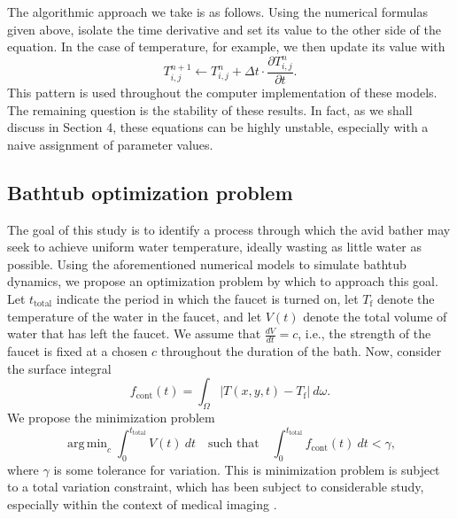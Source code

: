 \documentclass[12pt]{amsart}
\newcommand{\abs}[1]{\left|#1\right|}
\DeclareMathOperator*{\argmin}{\mathrm{arg\,min}}
\begin{document}
The algorithmic approach we take is as follows. Using the numerical formulas
given above, isolate the time derivative and set its value to the other side of
the equation. In the case of temperature, for example, we then update its value
with
\begin{equation}
    T_{i,j}^{n+1} \leftarrow T_{i,j}^{n} + \Delta t \cdot \frac{\partial
        T_{i,j}^n}{\partial t}.
    \label{eq:\theequation}
\end{equation}
This pattern is used throughout the computer implementation of these models. The
remaining question is the stability of these results. In fact, as we shall
discuss in Section 4, these equations can be highly unstable, especially with a
naive assignment of parameter values.



\subsection{Bathtub optimization problem}

The goal of this study is to identify a process through which the avid bather
may seek to achieve uniform water temperature, ideally wasting as little water
as possible. Using the aforementioned numerical models to simulate bathtub
dynamics, we propose an optimization problem by which to approach this goal. Let
$t_{\mathrm{total}}$ indicate the period in which the faucet is turned on, let
$T_{\mathrm{f}}$ denote the temperature of the water in the faucet, and let
$V(t)$ denote the total volume of water that has left the faucet. We assume that
$\frac{dV}{dt} = c$, i.e., the strength of the faucet is fixed at a chosen $c$ throughout the
duration of the bath. Now, consider the surface integral
\begin{equation}
    f_{\mathrm{cont}}(t) = \int_{\Omega} \abs{T(x,y,t) - T_{\mathrm{f}}} \ d\omega.
    \label{eq:\theequation}
\end{equation}
We propose the minimization problem
\begin{equation}
    \argmin_{c} \int_{0}^{t_{\mathrm{total}}} V(t) \ dt \quad \text{such that}
    \quad \int_{0}^{t_{\mathrm{total}}} f_{\mathrm{cont}}(t) \ dt < \gamma,
    \label{eq:\theequation}
\end{equation}
where $\gamma$ is some tolerance for variation. This is minimization
problem is subject to a total variation constraint, which has been subject to
considerable study, especially within the context of medical imaging
\cite{Zhang2005}.
\end{document}
